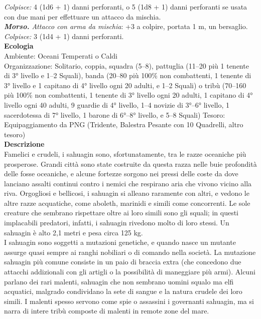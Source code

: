 \begin{multicols}{2}
\emph{Colpisce:} 4 (1d6 + 1) danni perforanti, o 5 (1d8 + 1) danni perforanti se usata con due mani per effettuare un attacco da mischia.\\

\emph{\textbf{Morso.} Attacco con arma da mischia}: +3 a colpire, portata 1 m, un bersaglio.\\

\emph{Colpisce:} 3 (1d4 + 1) danni perforanti.\\
\textbf{Ecologia}\\
Ambiente: Oceani Temperati o Caldi\\
Organizzazione: Solitario, coppia, squadra (5–8), pattuglia (11–20 più 1 tenente di 3° livello e 1–2 Squali), banda (20–80 più 100\% non combattenti, 1 tenente di 3° livello e 1 capitano di 4° livello ogni 20 adulti, e 1–2 Squali) o tribù (70–160 più 100\% non combattenti, 1 tenente di 3° livello ogni 20 adulti, 1 capitano di 4° livello ogni 40 adulti, 9 guardie di 4° livello, 1–4 novizie di 3°–6° livello, 1 sacerdotessa di 7° livello, 1 barone di 6°–8° livello, e 5–8 Squali)
Tesoro: Equipaggiamento da PNG (Tridente, Balestra Pesante con 10 Quadrelli, altro tesoro)\\
\textbf{Descrizione}\\
Famelici e crudeli, i sahuagin sono, sfortunatamente, tra le razze oceaniche più prosperose. Grandi città sono state costruite da questa razza nelle buie profondità delle fosse oceaniche, e alcune fortezze sorgono nei pressi delle coste da dove lanciano assalti continui contro i nemici che respirano aria che vivono vicino alla riva. Orgogliosi e bellicosi, i sahuagin si alleano raramente con altri, e vedono le altre razze acquatiche, come aboleth, marinidi e simili come concorrenti. Le sole creature che sembrano rispettare oltre ai loro simili sono gli squali; in questi implacabili predatori, infatti, i sahuagin rivedono molto di loro stessi. Un sahuagin è alto 2,1 metri e pesa circa 125 kg.\\

I sahuagin sono soggetti a mutazioni genetiche, e quando nasce un mutante assurge quasi sempre ai ranghi nobiliari o di comando nella società. La mutazione sahuagin più comune consiste in un paio di braccia extra (che concedono due attacchi addizionali con gli artigli o la possibilità di maneggiare più armi). Alcuni parlano dei rari malenti, sahuagin che non sembrano uomini squalo ma elfi acquatici, malgrado condividano la sete di sangue e la natura crudele dei loro simili. I malenti spesso servono come spie o assassini i governanti sahuagin, ma si narra di intere tribù composte di malenti in remote zone del mare.\\


\end{multicols}
